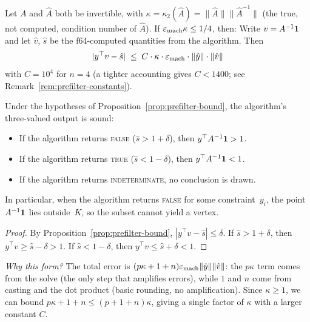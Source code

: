 \begin{unverified}
\begin{proposition}\label{prop:prefilter-bound}
Let $A$ and $\hat{A}$ both be invertible, with
$\kappa = \kappa_2(\hat{A}) = \|\hat{A}\|\|\hat{A}^{-1}\|$
(the true, not computed, condition number of $\hat{A}$).
If $\varepsilon_{\mathrm{mach}}\kappa \le 1/4$, then:
Write $v = A^{-1}\mathbf{1}$ and let $\hat{v}$, $\hat{s}$
be the f64-computed quantities from the algorithm.
Then
\[
  |y^\top v - \hat{s}|
  \;\le\;
  C \cdot \kappa \cdot \varepsilon_{\mathrm{mach}}
  \cdot \|\hat{y}\| \cdot \|\hat{v}\|
\]
with $C = 10^4$ for $n = 4$
(a tighter accounting gives $C < 1400$; see Remark~\ref{rem:prefilter-constants}).
\end{proposition}
\end{unverified}

\begin{unverified}
\begin{corollary}\label{cor:prefilter-soundness}
Under the hypotheses of Proposition~\ref{prop:prefilter-bound},
the algorithm's three-valued output is sound:
\begin{itemize}
\item If the algorithm returns \textsc{false}
  ($\hat{s} > 1 + \delta$), then $y^\top A^{-1}\mathbf{1} > 1$.
\item If the algorithm returns \textsc{true}
  ($\hat{s} < 1 - \delta$), then $y^\top A^{-1}\mathbf{1} < 1$.
\item If the algorithm returns \textsc{indeterminate},
  no conclusion is drawn.
\end{itemize}
In particular, when the algorithm returns \textsc{false}
for some constraint~$y_i$, the point $A^{-1}\mathbf{1}$ lies
outside~$K$, so the subset cannot yield a vertex.
\end{corollary}

\begin{proof}
By Proposition~\ref{prop:prefilter-bound},
$|y^\top v - \hat{s}| \le \delta$.
If $\hat{s} > 1 + \delta$, then
$y^\top v \ge \hat{s} - \delta > 1$.
If $\hat{s} < 1 - \delta$, then
$y^\top v \le \hat{s} + \delta < 1$.
\end{proof}
\end{unverified}

\noindent
\textit{Why this form?}
The total error is $(p\kappa + 1 + n)\varepsilon_{\mathrm{mach}}\|\hat{y}\|\|\hat{v}\|$:
the $p\kappa$ term comes from the solve (the only step that
amplifies errors), while $1$ and $n$ come from casting and
the dot product (basic rounding, no amplification).
Since $\kappa \ge 1$, we can bound
$p\kappa + 1 + n \le (p + 1 + n)\kappa$,
giving a single factor of $\kappa$ with a larger constant $C$.

